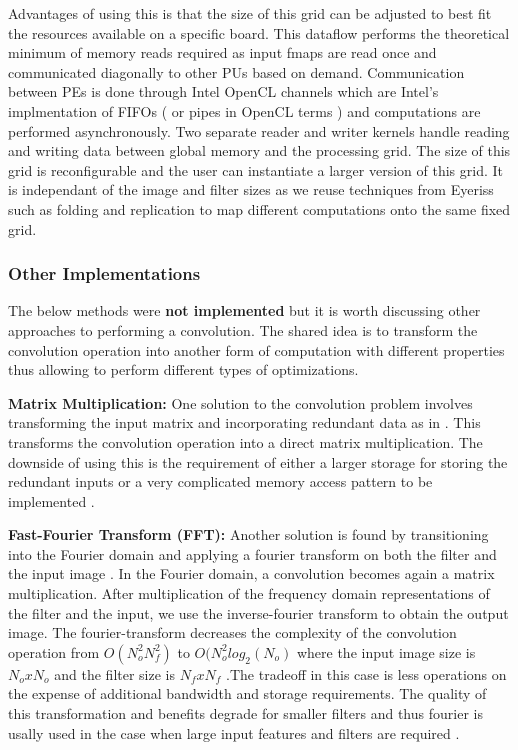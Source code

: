 Advantages of using this is that the size of this grid can be adjusted to best fit the resources available on a specific board. This dataflow performs the theoretical minimum of memory reads required as input fmaps are read once and communicated diagonally to other PUs based on demand. Communication between PEs is done through Intel OpenCL channels which are Intel’s implmentation of FIFOs ( or pipes in OpenCL terms ) and computations are performed asynchronously. Two separate reader and writer kernels handle reading and writing data between global memory and the processing grid. The size of this grid is reconfigurable and the user can instantiate a larger version of this grid. It is independant of the image and filter sizes as we reuse techniques from Eyeriss \cite{eyeriss} such as folding and replication to map different computations onto the same fixed grid.


\subsubsection{Other Implementations}

The below methods were \textbf{not implemented} but it is worth discussing other approaches to performing a convolution. The shared idea is to transform the convolution operation into another form of computation with different properties thus allowing to perform different types of optimizations. 

\textbf{Matrix Multiplication:} One solution to the convolution problem involves transforming the input matrix and incorporating redundant data as in \cite{cudnn}. This transforms the convolution operation into a direct matrix multiplication. The downside of using this is the requirement of either a larger storage for storing the redundant inputs or a very complicated memory access pattern to be implemented \cite{ddl}.

\textbf{Fast-Fourier Transform (FFT):} Another solution is found by transitioning into the Fourier domain and applying a fourier transform on both the filter and the input image \cite{vasilache2014fast}. In the Fourier domain, a convolution becomes again a matrix multiplication. After multiplication of the frequency domain representations of the filter and the input, we use the inverse-fourier transform to obtain the output image. The fourier-transform decreases the complexity of the convolution operation from $ O(N_o^2N_f^2) $ to $ O(N_o^2log_2(N_o) $ where the input image size is $ N_oxN_o$ and the filter size is $ N_fxN_f $ .The tradeoff in this case is less operations on the expense of additional bandwidth and storage requirements. The quality of this transformation and benefits degrade for smaller filters and thus fourier is usally used in the case when large input features and filters are required \cite{sze2017efficient}. 

